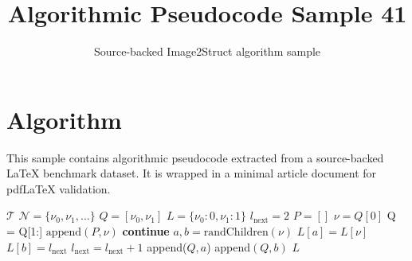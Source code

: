 \documentclass[11pt]{article}
\title{Algorithmic Pseudocode Sample 41}
\author{Source-backed Image2Struct algorithm sample}
\date{}
\begin{document}
\maketitle
\section{Algorithm}
This sample contains algorithmic pseudocode extracted from a source-backed LaTeX benchmark dataset. It is wrapped in a minimal article document for pdfLaTeX validation.

\begin{algorithm}[htbp]
\caption{Source-backed algorithmic procedure}
\begin{algorithm}
\caption{The Queue Shuffle } \begin{algorithmic}[1]
\Require $\mathcal{T}$ 
\Require $\mathcal{N} = \{\nu_0,\nu_1,...\}$ 
\State $Q = [\nu_0,\nu_1]$ 
\State $L = \{\nu_0 : 0, \nu_1 : 1\}$ 
\State $l_{\text{next}} = 2$
\State $P = []$ 
\State $\nu = Q[0]$ 
\State Q = Q[1:] 
\State $\text{append}(P,\nu)$ 
\State \textbf{continue} 
\EndIf
\State $a,b = \text{randChildren}(\nu)$ 
\State $L[a] = L[\nu]$ 
\State $L[b] = l_{\text{next}}$ 
\State $l_{\text{next}} = l_{\text{next}} +1$
\State append($Q,a$) 
\State append$(Q,b)$ 
\EndWhile
\State {} $L$ 
\end{algorithmic}
\end{algorithm}
\end{algorithm}
\end{document}

